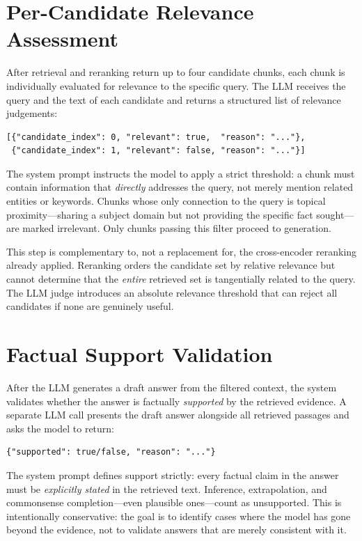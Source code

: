 \section{Per-Candidate Relevance Assessment}

After retrieval and reranking return up to four candidate chunks, each chunk is individually evaluated for relevance to the specific query. The LLM receives the query and the text of each candidate and returns a structured list of relevance judgements:

\begin{verbatim}
[{"candidate_index": 0, "relevant": true,  "reason": "..."},
 {"candidate_index": 1, "relevant": false, "reason": "..."}]
\end{verbatim}

The system prompt instructs the model to apply a strict threshold: a chunk must contain information that \emph{directly} addresses the query, not merely mention related entities or keywords. Chunks whose only connection to the query is topical proximity---sharing a subject domain but not providing the specific fact sought---are marked irrelevant. Only chunks passing this filter proceed to generation.

This step is complementary to, not a replacement for, the cross-encoder reranking already applied. Reranking orders the candidate set by relative relevance but cannot determine that the \emph{entire} retrieved set is tangentially related to the query. The LLM judge introduces an absolute relevance threshold that can reject all candidates if none are genuinely useful.

\section{Factual Support Validation}

After the LLM generates a draft answer from the filtered context, the system validates whether the answer is factually \emph{supported} by the retrieved evidence. A separate LLM call presents the draft answer alongside all retrieved passages and asks the model to return:

\begin{verbatim}
{"supported": true/false, "reason": "..."}
\end{verbatim}

The system prompt defines support strictly: every factual claim in the answer must be \emph{explicitly stated} in the retrieved text. Inference, extrapolation, and commonsense completion---even plausible ones---count as unsupported. This is intentionally conservative: the goal is to identify cases where the model has gone beyond the evidence, not to validate answers that are merely consistent with it.

